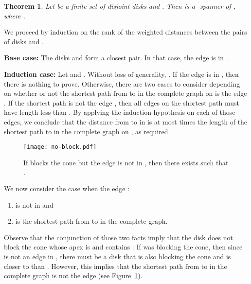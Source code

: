 \documentclass[pdftex,leqno,fleqn,12pt]{article}
\newtheorem{theorem}{Theorem}[section]
\newenvironment{proof}{{\textit Proof:} \rm}{\hfill  \medskip\\}
\begin{document}
\begin{theorem}\label{thm-add-yao} Let  be a finite set of
disjoint disks and .  Then  is a
-spanner of , where .  \end{theorem} \begin{proof} We proceed by induction
on the rank of the weighted distances between the pairs of disks  and
.

\textbf{Base case:} The disks  and  form a closest pair. In that case, the edge
 is in .

\textbf{Induction case:} Let  and . Without loss
of generality, . If the edge  is in
, then there is nothing to prove.  Otherwise, there
are two cases to consider depending on whether or not the shortest path from
 to  in the complete graph on  is the edge .
If the shortest path is not the edge , then all edges on the
shortest path must have length less than . By applying the
induction hypothesis on each of those edges, we conclude that the distance from
 to  in  is at most  times the length of
the shortest path  to  in the complete graph on , as
required.

\begin{figure}
\centering\texttt{[image: no-block.pdf]}\caption{If  blocks the cone but the edge  is not in , then there exists  such that .}\label{fig-no-block}
\end{figure}

We now consider the case when the edge :
\begin{enumerate}
\item is not in  and
\item is the shortest path from  to  in the complete graph.
\end{enumerate}

Observe that the conjunction of those two facts imply that the disk  does
not block the cone whose apex is  and contains : If  was
blocking the cone, then since  is not an edge in
, there must be a disk  that is also blocking
the cone and is closer to  than . However, this implies that the
shortest path from  to  in the complete graph is not the edge
 (see Figure~\ref{fig-no-block}).


\end{proof}
\end{document}
